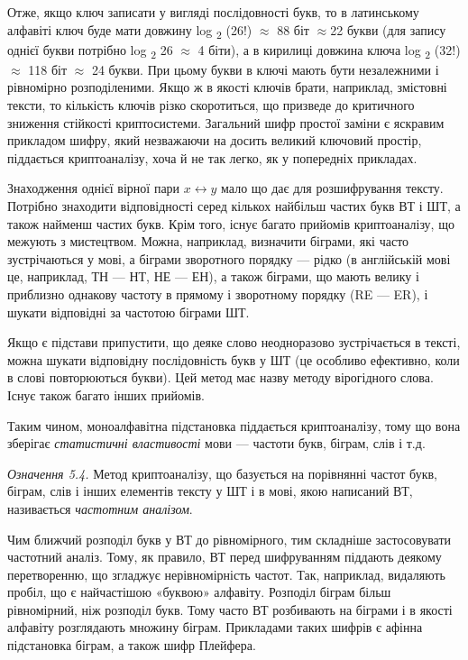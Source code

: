 Отже, якщо ключ записати у вигляді послідовності букв, то в латинському алфавіті
ключ буде мати довжину  log \textsubscript{2 }(26!) ${\approx}$ 88 біт
${\approx}$22 букви  (для запису однієї букви потрібно log \textsubscript{2 }26
${\approx}$ 4 біти), а в кирилиці довжина ключа  log \textsubscript{2 }(32!)
${\approx}$ 118 біт ${\approx}$ 24 букви. При цьому букви в ключі мають бути
незалежними і рівномірно розподіленими. Якщо ж в якості ключів брати,
наприклад, змістовні тексти, то кількість ключів різко скоротиться, що призведе
до критичного зниження стійкості криптосистеми. Загальний шифр простої заміни є
яскравим прикладом шифру, який незважаючи на досить великий ключовий простір,
піддається криптоаналізу, хоча й не так легко, як у попередніх прикладах.

Знаходження однієї вірної пари   ${x\leftrightarrow y}$ мало що дає для
розшифрування тексту. Потрібно знаходити відповідності серед кількох найбільш
частих букв ВТ і ШТ, а також найменш частих букв. Крім того, існує багато
прийомів криптоаналізу, що межують з мистецтвом. Можна, наприклад, визначити
біграми, які часто зустрічаються у мові, а  біграми зворотного порядку --- рідко
(в англійській мові це, наприклад, ТН --- НТ, НЕ --- ЕН), а також біграми, що мають
велику і приблизно однакову частоту в прямому і зворотному порядку (RE --- ER), і
шукати відповідні за частотою  біграми ШТ.

Якщо є підстави припустити, що деяке слово неодноразово зустрічається в тексті,
можна шукати відповідну послідовність букв у ШТ (це особливо ефективно, коли в
слові повторюються букви). Цей метод має назву методу вірогідного слова. Існує
також багато інших прийомів.

Таким чином, моноалфавітна підстановка піддається криптоаналізу, тому що вона
зберігає \textit{статистичні властивості} мови --- частоти букв, біграм, слів і
т.д.

\textit{Означення 5.4.}\textit{ }Метод криптоаналізу, що базується на порівнянні
частот букв, біграм, слів і інших елементів тексту у ШТ і в мові, якою
написаний ВТ, називається \textit{частотним аналізом}.

Чим ближчий розподіл букв у ВТ до рівномірного, тим складніше застосовувати
частотний аналіз. Тому, як правило, ВТ перед шифруванням піддають деякому
перетворенню, що згладжує нерівномірність частот. Так, наприклад, видаляють
пробіл, що є найчастішою «буквою» алфавіту. Розподіл біграм більш рівномірний,
ніж розподіл букв. Тому часто ВТ розбивають на біграми і в якості алфавіту
розглядають множину біграм. Прикладами таких шифрів є афінна підстановка
біграм, а також шифр Плейфера.


